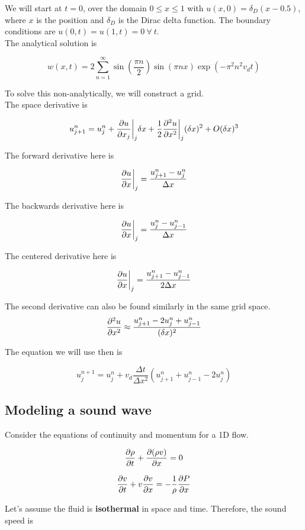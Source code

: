 \documentclass[]{article}
\begin{document}
We will start at $t=0$, over the domain $0 \leq x \leq 1$ with $u(x, 0) = \delta_D(x-0.5)$, where $x$ is the position and $\delta_D$ is the Dirac delta function. The boundary conditions are $u(0, t) = u(1, t) = 0~\forall~t$.\\

The analytical solution is

\[w(x, t) = 2 \sum_{n=1}^{\infty} \sin(\frac{\pi n}{2}) \sin(\pi n x) \exp(-\pi^2 n^2 v_d t)\]

To solve this non-analytically, we will construct a grid. \\


The space derivative is

\[u_{j+1}^n = u_j^n + \pdv{u}{x_j}\biggr|_j \delta x + \frac{1}{2} \pdv[2]{u}{x}\biggr|_j (\delta x)^2 + O(\delta x)^3\]

The forward derivative here is

\[\pdv{u}{x}\biggr|_j = \frac{u_{j+1}^n - u_j^n}{\Delta x}\]

The backwards derivative here is 

\[\pdv{u}{x}\biggr|_j = \frac{u_{j}^n - u_{j-1}^n}{\Delta x}\]

The centered derivative here is 

\[\pdv{u}{x}\biggr|_j = \frac{u_{j+1}^n - u_{j-1}^n}{2\Delta x}\]

The second derivative can also be found similarly in the same grid space.\\

\[\pdv[2]{u}{x} \approx \frac{u_{j+1}^n - 2u_j^n + u_{j-1}^n}{(\delta x)^2}\]

The equation we will use then is

\[u_j^{n+1} = u^n_j + v_d\frac{\Delta t}{\Delta x^2}(u_{j+1}^n + u_{j-1}^n - 2u^n_{j})\]


\subsection{Modeling a sound wave}\bigbreak

Consider the equations of continuity and momentum for a 1D flow.

\[\pdv{\rho}{t} + \pdv{(\rho v)}{x} = 0\]

\[\pdv{v}{t} + v\pdv{v}{x} = -\frac{1}{\rho} \pdv{P}{x}\]

Let's assume the fluid is \textbf{isothermal} in space and time. Therefore, the sound speed is
\end{document}
